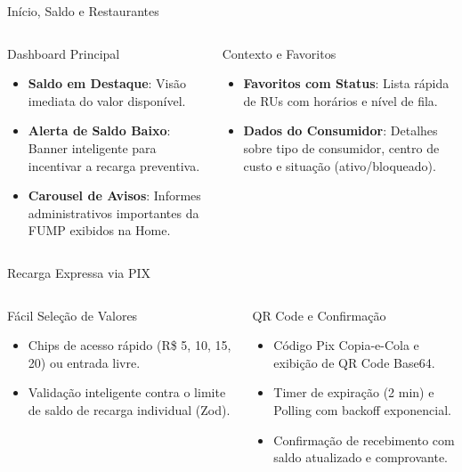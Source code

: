 \documentclass[10pt, aspectratio=169]{beamer}
\begin{document}
\begin{frame}{Início, Saldo e Restaurantes}
  \begin{columns}[T,onlytextwidth]
      \begin{block}{Dashboard Principal}
        \small
        \begin{itemize}
          \item \textbf{Saldo em Destaque}: Visão imediata do valor disponível.
          \item \textbf{Alerta de Saldo Baixo}: Banner inteligente para incentivar a recarga preventiva.
          \item \textbf{Carousel de Avisos}: Informes administrativos importantes da FUMP exibidos na Home.
        \end{itemize}
      \end{block}

      \begin{exampleblock}{Contexto e Favoritos}
        \small
        \begin{itemize}
          \item \textbf{Favoritos com Status}: Lista rápida de RUs com horários e nível de fila.
          \item \textbf{Dados do Consumidor}: Detalhes sobre tipo de consumidor, centro de custo e situação (ativo/bloqueado).
        \end{itemize}
      \end{exampleblock}
  \end{columns}
\end{frame}

\begin{frame}{Recarga Expressa via PIX}
  \begin{columns}[T,onlytextwidth]
      \begin{block}{Fácil Seleção de Valores}
        \small
        \begin{itemize}
          \item Chips de acesso rápido (R\$ 5, 10, 15, 20) ou entrada livre.
          \item Validação inteligente contra o limite de saldo de recarga individual (Zod).
        \end{itemize}
      \end{block}

      \begin{alertblock}{QR Code e Confirmação}
        \small
        \begin{itemize}
          \item Código Pix Copia-e-Cola e exibição de QR Code Base64.
          \item Timer de expiração (2 min) e Polling com backoff exponencial.
          \item Confirmação de recebimento com saldo atualizado e comprovante.
        \end{itemize}
      \end{alertblock}
  \end{columns}
\end{frame}
\end{document}
